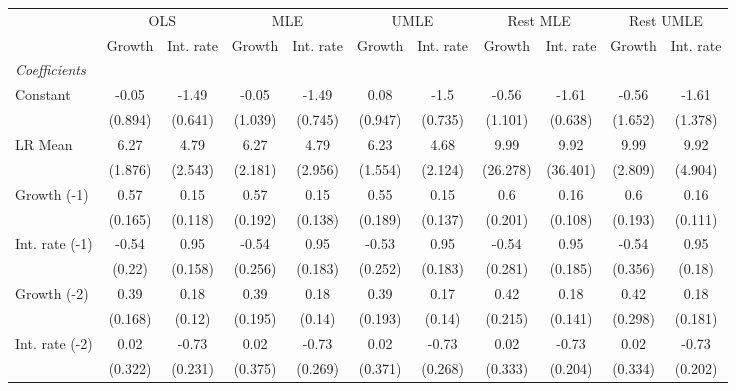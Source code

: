 \begin{table}[htbp] 
	\centering
	\begin{tabular}{@{\extracolsep{4pt}}lcccccccccc@{}}		\hline\hline
		 		 & \multicolumn{2}{c}{OLS} &\multicolumn{2}{c}{MLE} &\multicolumn{2}{c}{UMLE} &\multicolumn{2}{c}{Rest MLE} &\multicolumn{2}{c}{Rest UMLE} \\ 
 		 & Growth 	 & Int. rate 	 & Growth 	 & Int. rate 	 & Growth 	 & Int. rate 	 & Growth 	 & Int. rate 	 & Growth 	 & Int. rate\\\cline{2-3}\cline{4-5}\cline{6-7}\cline{8-9}\cline{10-11}
\rule{0pt}{4ex} 
 \emph{Coefficients} 	  		 & 		 & 		 & 		 & 		 & 		 & 		 & 		 & 		 & 		 &\\ 
\quad Constant 	 & -0.05 	 & -1.49 	 & -0.05 	 & -1.49 	 & 0.08 	 & -1.5 	 & -0.56 	 & -1.61 	 & -0.56 	 & -1.61	 \\ 
 		 & (0.894) 	 & (0.641) 	 & (1.039) 	 & (0.745) 	 & (0.947) 	 & (0.735) 	 & (1.101) 	 & (0.638) 	 & (1.652) 	 & (1.378) 	 \\ 
\quad LR Mean 	 & 6.27 	 & 4.79 	 & 6.27 	 & 4.79 	 & 6.23 	 & 4.68 	 & 9.99 	 & 9.92 	 & 9.99 	 & 9.92	 \\ 
 		 & (1.876) 	 & (2.543) 	 & (2.181) 	 & (2.956) 	 & (1.554) 	 & (2.124) 	 & (26.278) 	 & (36.401) 	 & (2.809) 	 & (4.904) 	 \\ 
\quad Growth (-1) 	 &0.57 	 & 0.15 	 & 0.57 	 & 0.15 	 & 0.55 	 & 0.15 	 & 0.6 	 & 0.16 	 & 0.6 	 & 0.16	 \\ 
 		 & (0.165) 	 & (0.118) 	 & (0.192) 	 & (0.138) 	 & (0.189) 	 & (0.137) 	 & (0.201) 	 & (0.108) 	 & (0.193) 	 & (0.111) 	 \\ 
\quad Int. rate (-1) 	 &-0.54 	 & 0.95 	 & -0.54 	 & 0.95 	 & -0.53 	 & 0.95 	 & -0.54 	 & 0.95 	 & -0.54 	 & 0.95	 \\ 
 		 & (0.22) 	 & (0.158) 	 & (0.256) 	 & (0.183) 	 & (0.252) 	 & (0.183) 	 & (0.281) 	 & (0.185) 	 & (0.356) 	 & (0.18) 	 \\ 
\quad Growth (-2) 	 &0.39 	 & 0.18 	 & 0.39 	 & 0.18 	 & 0.39 	 & 0.17 	 & 0.42 	 & 0.18 	 & 0.42 	 & 0.18	 \\ 
 		 & (0.168) 	 & (0.12) 	 & (0.195) 	 & (0.14) 	 & (0.193) 	 & (0.14) 	 & (0.215) 	 & (0.141) 	 & (0.298) 	 & (0.181) 	 \\ 
\quad Int. rate (-2) 	 &0.02 	 & -0.73 	 & 0.02 	 & -0.73 	 & 0.02 	 & -0.73 	 & 0.02 	 & -0.73 	 & 0.02 	 & -0.73	 \\ 
 		 & (0.322) 	 & (0.231) 	 & (0.375) 	 & (0.269) 	 & (0.371) 	 & (0.268) 	 & (0.333) 	 & (0.204) 	 & (0.334) 	 & (0.202) 	 \\ 

\end{tabular}
\end{table}
